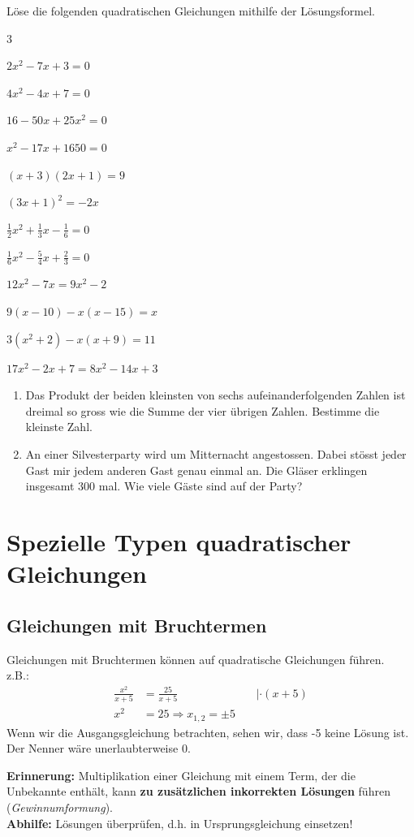 \documentclass[11pt,oneside]{article}
\begin{document}
	\begin{aufgabe}
		Löse die folgenden quadratischen Gleichungen mithilfe der Lösungsformel.
		\begin{enumerate}[label=\alph*)]\end{enumerate}
	\end{aufgabe}
	\begin{aufgabe}
		\begin{enumerate}[label=\alph*)]
			\item Das Produkt der beiden kleinsten von sechs aufeinanderfolgenden Zahlen ist dreimal so gross wie die Summe der vier übrigen Zahlen. Bestimme die kleinste Zahl.
			\item An einer Silvesterparty wird um Mitternacht angestossen. Dabei stösst jeder Gast mir jedem anderen Gast genau einmal an. Die Gläser erklingen insgesamt $300$ mal. Wie viele Gäste sind auf der Party?
		\end{enumerate}
	\end{aufgabe}


\newpage
\section{Spezielle Typen quadratischer Gleichungen}
\subsection{Gleichungen mit Bruchtermen}
	Gleichungen mit Bruchtermen können auf quadratische Gleichungen führen.\\ z.B.:
	\begin{align*}
		\frac{x^2}{x+5}&=\frac{25}{x+5}&~&|\cdot (x+5)\\
		x^2&=25
		\Rightarrow x_{1,2}=\pm 5
	\end{align*}
	Wenn wir die Ausgangsgleichung betrachten, sehen wir, dass -5 keine Lösung ist. Der Nenner wäre unerlaubterweise 0.
	\begin{framed}\noindent
		\textbf{Erinnerung:}
		Multiplikation einer Gleichung mit einem Term, der die Unbekannte enthält, kann \textbf{zu zusätzlichen inkorrekten Lösungen} führen (\textit{Gewinnumformung}).\\
		\textbf{Abhilfe:}
		Lösungen überprüfen, d.h. in Ursprungsgleichung einsetzen!
	\end{framed}
\end{document}
